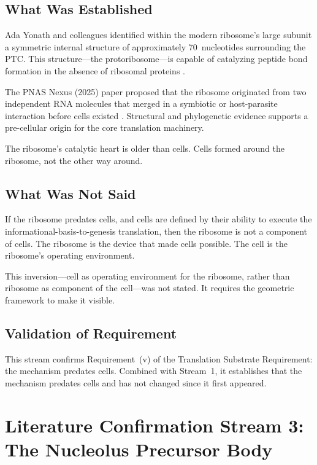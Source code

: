 \documentclass[11pt]{article}
\theoremstyle{definition}
\begin{document}
\subsection{What Was Established}

Ada Yonath and colleagues identified within the modern ribosome's
large subunit a symmetric internal structure of approximately
70~nucleotides surrounding the PTC.
This structure---the protoribosome---is capable of catalyzing
peptide bond formation in the absence of ribosomal proteins
\cite{Yonath2024}.

The PNAS Nexus (2025) paper proposed that the ribosome originated
from two independent RNA molecules that merged in a symbiotic or
host-parasite interaction before cells existed \cite{PNASNexus2025}.
Structural and phylogenetic evidence supports a pre-cellular origin
for the core translation machinery.

The ribosome's catalytic heart is older than cells.
Cells formed around the ribosome, not the other way around.

\subsection{What Was Not Said}

If the ribosome predates cells, and cells are defined by their
ability to execute the informational-basis-to-genesis translation,
then the ribosome is not a component of cells.
The ribosome is the device that made cells possible.
The cell is the ribosome's operating environment.

This inversion---cell as operating environment for the ribosome,
rather than ribosome as component of the cell---was not stated.
It requires the geometric framework to make it visible.

\subsection{Validation of Requirement}

This stream confirms Requirement~(v) of the Translation Substrate
Requirement: the mechanism predates cells.
Combined with Stream~1, it establishes that the mechanism predates
cells and has not changed since it first appeared.

\section{Literature Confirmation Stream 3:\\
The Nucleolus Precursor Body}
\label{sec:literature3}
\end{document}

